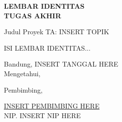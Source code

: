 \clearpage
\pagestyle{empty}

\begin{center}
  \smallskip

  \Large \bfseries \MakeUppercase{Lembar Identitas \\ Tugas Akhir}
  \vspace{\baselineskip}

  \normalsize \normalfont
  \begin{flushleft}
    Judul Proyek TA\qquad: {{INSERT TOPIK}}
    \medskip
    
    {{ISI LEMBAR IDENTITAS...}}
  \end{flushleft}
  \vfill
  Bandung, {{INSERT TANGGAL HERE}}\\
  Mengetahui,

  \vspace{0.5cm}
  Pembimbing,

  \vspace{2cm}
  \underline{{{INSERT PEMBIMBING HERE}}} \\
  NIP. {{INSERT NIP HERE}}
  \vspace{3cm}

\end{center}
\clearpage
